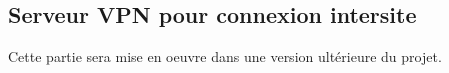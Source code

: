 \subsection{Serveur VPN pour connexion intersite}

\begin{tip}
    \textcolor{Chartreuse4}{Cette partie sera mise en oeuvre dans une version ultérieure du projet.}
\end{tip}